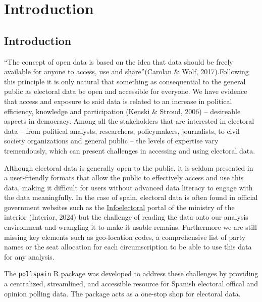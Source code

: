 \documentclass[
  letterpaper,
  DIV=11,
  numbers=noendperiod]{scrreprt}
\begin{document}

\hypertarget{introduction}{%
\chapter{Introduction}\label{introduction}}

\hypertarget{introduction-1}{%
\section{Introduction}\label{introduction-1}}

``The concept of open data is based on the idea that data should be
freely available for anyone to access, use and share''(Carolan \& Wolf,
2017).Following this principle it is only natural that something as
consequential to the general public as electoral data be open and
accessible for everyone. We have evidence that access and exposure to
said data is related to an increase in political efficiency, knowledge
and participation (Kenski \& Stroud, 2006) -- desireable aspects in
democracy. Among all the stakeholders that are interested in electoral
data -- from political analysts, researchers, policymakers, journalists,
to civil society organizations and general public -- the levels of
expertise vary tremendously, which can present challenges in accessing
and using electoral data.

Although electoral data is generally open to the public, it is seldom
presented in a user-friendly formats that allow the public to
effectively access and use this data, making it difficult for users
without advanced data literacy to engage with the data meaningfully. In
the case of spain, electoral data is often found in official government
websites such as the
\href{https://infoelectoral.interior.gob.es/es/elecciones-celebradas/area-de-descargas/}{Infoelectoral}
portal of the ministry of the interior (Interior, 2024) but the
challenge of reading the data onto our analysis environment and
wrangling it to make it usable remains. Furthermore we are still missing
key elements such as geo-location codes, a comprehensive list of party
names or the seat allocation for each circumscription to be able to use
this data for any analysis.

The \texttt{pollspain} R package was developed to address these
challenges by providing a centralized, streamlined, and accessible
resource for Spanish electoral offical and opinion polling data. The
package acts as a one-stop shop for electoral data.
\end{document}
